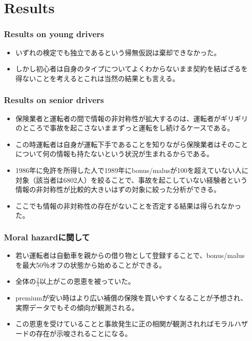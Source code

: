 \documentclass[dvipdfmx, 12pt]{beamer}
\begin{document}
\section{Results}
\begin{frame}\frametitle{Results on young drivers}
	\begin{itemize}
	\item いずれの検定でも独立であるという帰無仮説は棄却できなかった。
	\item しかし初心者は自身のタイプについてよくわからないまま契約を結ばざるを得ないことを考えるとこれは当然の結果とも言える。
	\end{itemize}
\end{frame}

\begin{frame}\frametitle{Results on senior drivers}
	\begin{itemize}
	\item 保険業者と運転者の間で情報の非対称性が拡大するのは、運転者がギリギリのところで事故を起こさないままずっと運転をし続けるケースである。
	\item この時運転者は自身が運転下手であることを知りながら保険業者はそのことについて何の情報も持たないという状況が生まれるからである。
	\item 1986年に免許を所得した人で1989年にbonus/malusが100を超えていない人に対象（該当者は6802人）を絞ることで、事故を起こしていない経験者という情報の非対称性が比較的大きいはずの対象に絞った分析ができる。
	\item ここでも情報の非対称性の存在がないことを否定する結果は得られなかった。
	\end{itemize}
\end{frame}

\begin{frame}\frametitle{Moral hazardに関して}
	\begin{itemize}
	\item 若い運転者は自動車を親からの借り物として登録することで、bonus/malusを最大50％オフの状態から始めることができる。
	\item 全体の$\frac{2}{3}$以上がこの恩恵を被っていた。
	\item premiumが安い時はより広い補償の保険を買いやすくなることが予想され、実際データでもその傾向が観測される。
	\item この恩恵を受けていることと事故発生に正の相関が観測されればモラルハザードの存在が示唆されることになる。
	\end{itemize}
\end{frame}
\end{document}
